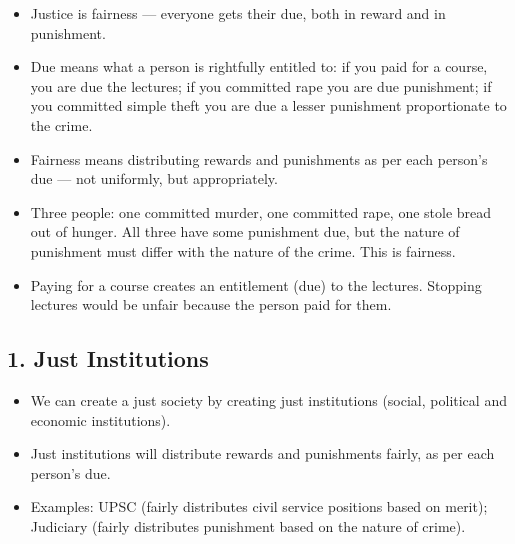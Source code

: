 \begin{KeyConcept}
\begin{itemize}
\item Justice is fairness --- everyone gets their due, both in reward and in punishment.
\item Due means what a person is rightfully entitled to: if you paid for a course, you are due the lectures; if you committed rape you are due punishment; if you committed simple theft you are due a lesser punishment proportionate to the crime.
\item Fairness means distributing rewards and punishments as per each person's due --- not uniformly, but appropriately.
\end{itemize}
\end{KeyConcept}

\begin{ExampleBox}
\begin{itemize}
\item Three people: one committed murder, one committed rape, one stole bread out of hunger. All three have some punishment due, but the nature of punishment must differ with the nature of the crime. This is fairness.
\item Paying for a course creates an entitlement (due) to the lectures. Stopping lectures would be unfair because the person paid for them.
\end{itemize}
\end{ExampleBox}

\subsection*{1. Just Institutions}
\begin{KeyConcept}
\begin{itemize}
\item We can create a just society by creating just institutions (social, political and economic institutions).
\item Just institutions will distribute rewards and punishments fairly, as per each person's due.
\item Examples: UPSC (fairly distributes civil service positions based on merit); Judiciary (fairly distributes punishment based on the nature of crime).
\end{itemize}
\end{KeyConcept}

